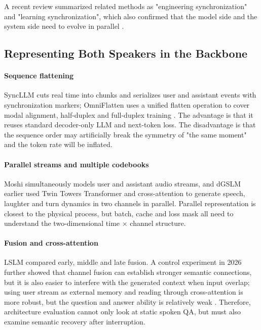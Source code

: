 \documentclass[UTF8,fontset=none,a4paper,10pt]{ctexart}
\begin{document}
A recent review summarized related methods as "engineering synchronization" and "learning synchronization", which also confirmed that the model side and the system side need to evolve in parallel \cite{en:chen2025survey}.

\subsection{Representing Both Speakers in the Backbone}

\paragraph{Sequence flattening}
SyncLLM cuts real time into chunks and serializes user and assistant events with synchronization markers; OmniFlatten uses a unified flatten operation to cover modal alignment, half-duplex and full-duplex training \cite{en:veluri2024syncllm,en:zhang2024omniflatten}. The advantage is that it reuses standard decoder-only LLM and next-token loss. The disadvantage is that the sequence order may artificially break the symmetry of "the same moment" and the token rate will be inflated.

\paragraph{Parallel streams and multiple codebooks}
Moshi simultaneously models user and assistant audio streams, and dGSLM earlier used Twin Towers Transformer and cross-attention to generate speech, laughter and turn dynamics \cite{en:nguyen2022dgslm,en:defossez2024moshi} in two channels in parallel. Parallel representation is closest to the physical process, but batch, cache and loss mask all need to understand the two-dimensional time $\times$ channel structure.

\paragraph{Fusion and cross-attention}
LSLM compared early, middle and late fusion. A control experiment in 2026 further showed that channel fusion can establish stronger semantic connections, but it is also easier to interfere with the generated context when input overlap; using user stream as external memory and reading through cross-attention is more robust, but the question and answer ability is relatively weak \cite{en:ma2025lslm,en:lu2026routing}. Therefore, architecture evaluation cannot only look at static spoken QA, but must also examine semantic recovery after interruption.
\end{document}
